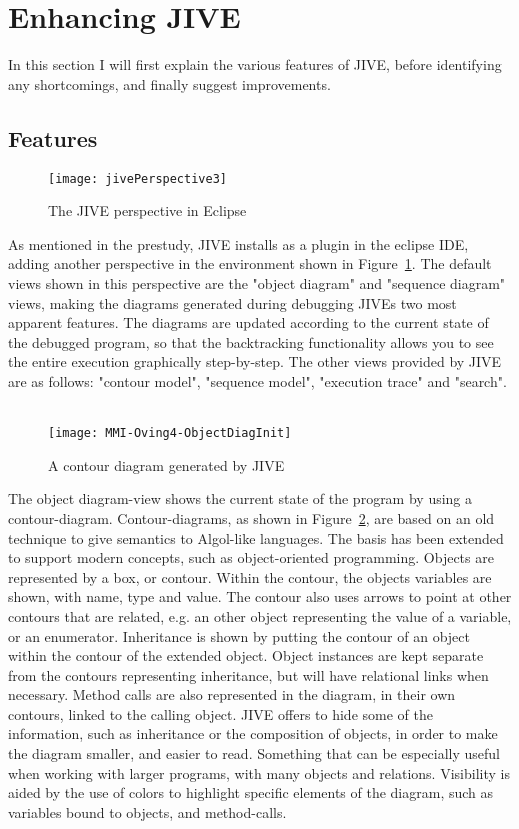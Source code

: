 \section{Enhancing JIVE}\label{enhJive}

In this section I will first explain the various features of JIVE, before identifying any shortcomings, and finally suggest improvements.

\subsection{Features}\label{jiveFeatures}

\begin{figure}[H]
	\texttt{[image: jivePerspective3]}
	\caption{The JIVE perspective in Eclipse}
	\label{fig:jivePerspective}
\end{figure}
As mentioned in the prestudy, JIVE installs as a plugin in the eclipse IDE, adding another perspective in the environment shown in Figure~\ref{fig:jivePerspective}.
The default views shown in this perspective are the "object diagram" and "sequence diagram" views, making the diagrams generated during debugging JIVEs two most apparent features.
The diagrams are updated according to the current state of the debugged program, so that the backtracking functionality allows you to see the entire execution graphically step-by-step.
The other views provided by JIVE are as follows: "contour model", "sequence model", "execution trace" and "search".
~\\

\begin{figure}[H]
	\texttt{[image: MMI-Oving4-ObjectDiagInit]}
	\caption{A contour diagram generated by JIVE}
	\label{fig:oving4ContDiagInit}
\end{figure}
The object diagram-view shows the current state of the program by using a contour-diagram.
Contour-diagrams, as shown in Figure~\ref{fig:oving4ContDiagInit}, are based on an old technique to give semantics to Algol-like languages.
The basis has been extended to support modern concepts, such as object-oriented programming.
Objects are represented by a box, or contour.
Within the contour, the objects variables are shown, with name, type and value.
The contour also uses arrows to point at other contours that are related, e.g. an other object representing the value of a variable, or an enumerator.
Inheritance is shown by putting the contour of an object within the contour of the extended object. 
Object instances are kept separate from the contours representing inheritance, but will have relational links when necessary.
Method calls are also represented in the diagram, in their own contours, linked to the calling object.
JIVE offers to hide some of the information, such as inheritance or the composition of objects, in order to make the diagram smaller, and easier to read.
Something that can be especially useful when working with larger programs, with many objects and relations.
Visibility is aided by the use of colors to highlight specific elements of the diagram, such as variables bound to objects, and method-calls.
~\\

